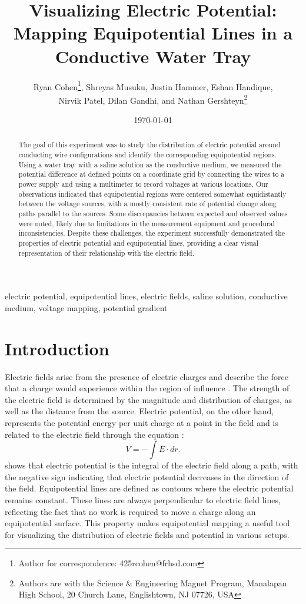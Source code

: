 \documentclass[10pt,journal,twoside]{IEEEtran}
\title{Visualizing Electric Potential: Mapping Equipotential Lines in a Conductive Water Tray}
\author{Ryan Cohen\thanks{Author for correspondence: 425rcohen@frhsd.com}, Shreyas Musuku, Justin Hammer, Eshan Handique,\\Nirvik Patel, Dilan Gandhi, and Nathan Gershteyn\thanks{Authors are with the Science \& Engineering Magnet Program, Manalapan High School, 20 Church Lane, Englishtown, NJ 07726, USA}}
\date{\today}
\newcommand{\keywords}{electric potential, equipotential lines, electric fields, saline solution, conductive medium, voltage mapping, potential gradient}
\begin{document}
\maketitle

\begin{abstract}
The goal of this experiment was to study the distribution of electric potential around conducting wire configurations and identify the corresponding equipotential regions. Using a water tray with a saline solution as the conductive medium, we measured the potential difference at defined points on a coordinate grid by connecting the wires to a power supply and using a multimeter to record voltages at various locations. Our observations indicated that equipotential regions were centered somewhat equidistantly between the voltage sources, with a mostly consistent rate of potential change along paths parallel to the sources. Some discrepancies between expected and observed values were noted, likely due to limitations in the measurement equipment and procedural inconsistencies. Despite these challenges, the experiment successfully demonstrated the properties of electric potential and equipotential lines, providing a clear visual representation of their relationship with the electric field.
\end{abstract}

\begin{IEEEkeywords}
\keywords
\end{IEEEkeywords}

\section{Introduction}
Electric fields arise from the presence of electric charges and describe the force that a charge would experience within the region of influence \cite{tipler, barrons, ling-2016-university}. The strength of the electric field is determined by the magnitude and distribution of charges, as well as the distance from the source. Electric potential, on the other hand, represents the potential energy per unit charge at a point in the field and is related to the electric field through the equation \cite{tipler}:
\begin{equation}
V = -\int E \cdot dr.
\label{eq:potential}
\end{equation}
 shows that electric potential is the integral of the electric field along a path, with the negative sign indicating that electric potential decreases in the direction of the field. Equipotential lines are defined as contours where the electric potential remains constant. These lines are always perpendicular to electric field lines, reflecting the fact that no work is required to move a charge along an equipotential surface. This property makes equipotential mapping a useful tool for visualizing the distribution of electric fields and potential in various setups.
\end{document}
